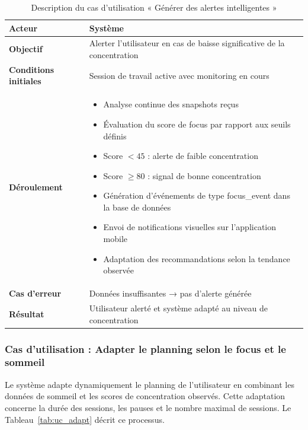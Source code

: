 \begin{table}[H]
\centering
\renewcommand{\arraystretch}{1.2}
\begin{tabular}{|p{4cm}|p{10cm}|}
\hline
\textbf{Acteur} & Système \\ \hline

\textbf{Objectif} & Alerter l'utilisateur en cas de baisse significative de la concentration \\ \hline

\textbf{Conditions initiales} & Session de travail active avec monitoring en cours \\ \hline

\textbf{Déroulement} &
\begin{itemize}
    \item Analyse continue des snapshots reçus
    \item Évaluation du score de focus par rapport aux seuils définis
    \item Score $< 45$ : alerte de faible concentration
    \item Score $\geq 80$ : signal de bonne concentration
    \item Génération d'événements de type focus\_event dans la base de données
    \item Envoi de notifications visuelles sur l'application mobile
    \item Adaptation des recommandations selon la tendance observée
\end{itemize} \\ \hline

\textbf{Cas d'erreur} & Données insuffisantes → pas d'alerte générée \\ \hline

\textbf{Résultat} & Utilisateur alerté et système adapté au niveau de concentration \\ \hline
\end{tabular}
\caption{Description du cas d'utilisation « Générer des alertes intelligentes »}
\label{tab:uc_alerts}
\end{table}

\subsubsection{Cas d'utilisation : Adapter le planning selon le focus et le sommeil}

Le système adapte dynamiquement le planning de l'utilisateur en combinant les données de sommeil et les scores de concentration observés. Cette adaptation concerne la durée des sessions, les pauses et le nombre maximal de sessions. Le Tableau~\ref{tab:uc_adapt} décrit ce processus.

